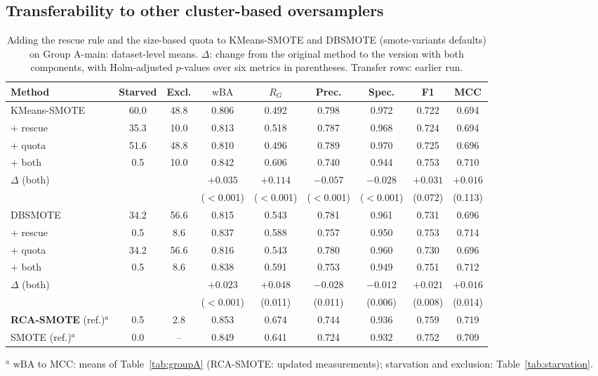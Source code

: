\documentclass[preprint,nopreprintline]{elsarticle}
\theoremstyle{plain}
\theoremstyle{definition}
\newcommand{\wba}{\mathrm{wBA}}
\newcommand{\rg}{R_{G}}
\newcommand{\tabfont}{\fontsize{8}{9.4}\selectfont}
\providecommand{\botrule}{\bottomrule}
\begin{document}
\subsection{Transferability to other cluster-based oversamplers}\label{sec:transfer}

\begin{table}[!htb]
\caption{Adding the rescue rule and the size-based quota to KMeans-SMOTE and DBSMOTE (smote-variants defaults) on Group A-main: dataset-level means. $\Delta$: change from the original method to the version with both components, with Holm-adjusted $p$-values over six metrics in parentheses. Transfer rows: earlier run.}\label{tab:transfer}
\centering\tabfont
\setlength{\tabcolsep}{2.4pt}
\begin{adjustbox}{max width=\textwidth}
\begin{tabular}{@{}lcccccccc@{}}
\toprule
Method & Starved & Excl. & $\wba$ & $\rg$ & Prec. & Spec. & F1 & MCC \\
\midrule
KMeans-SMOTE & 60.0 & 48.8 & 0.806 & 0.492 & 0.798 & 0.972 & 0.722 & 0.694 \\
\quad + rescue & 35.3 & 10.0 & 0.813 & 0.518 & 0.787 & 0.968 & 0.724 & 0.694 \\
\quad + quota & 51.6 & 48.8 & 0.810 & 0.496 & 0.789 & 0.970 & 0.725 & 0.696 \\
\quad + both & 0.5 & 10.0 & 0.842 & 0.606 & 0.740 & 0.944 & 0.753 & 0.710 \\
\quad $\Delta$ (both) & & & $+0.035$ & $+0.114$ & $-0.057$ & $-0.028$ & $+0.031$ & $+0.016$ \\
 & & & \scriptsize($<$0.001) & \scriptsize($<$0.001) & \scriptsize($<$0.001) & \scriptsize($<$0.001) & \scriptsize(0.072) & \scriptsize(0.113) \\
\midrule
DBSMOTE & 34.2 & 56.6 & 0.815 & 0.543 & 0.781 & 0.961 & 0.731 & 0.696 \\
\quad + rescue & 0.5 & 8.6 & 0.837 & 0.588 & 0.757 & 0.950 & 0.753 & 0.714 \\
\quad + quota & 34.2 & 56.6 & 0.816 & 0.543 & 0.780 & 0.960 & 0.730 & 0.696 \\
\quad + both & 0.5 & 8.6 & 0.838 & 0.591 & 0.753 & 0.949 & 0.751 & 0.712 \\
\quad $\Delta$ (both) & & & $+0.023$ & $+0.048$ & $-0.028$ & $-0.012$ & $+0.021$ & $+0.016$ \\
 & & & \scriptsize($<$0.001) & \scriptsize(0.011) & \scriptsize(0.011) & \scriptsize(0.006) & \scriptsize(0.008) & \scriptsize(0.014) \\
\midrule
\textbf{RCA-SMOTE} (ref.)$^{a}$ & 0.5 & 2.8 & 0.853 & 0.674 & 0.744 & 0.936 & 0.759 & 0.719 \\
SMOTE (ref.)$^{a}$ & 0.0 & -- & 0.849 & 0.641 & 0.724 & 0.932 & 0.752 & 0.709 \\
\botrule
\end{tabular}
\end{adjustbox}
\par\smallskip\raggedright\footnotesize $^{a}$ $\wba$ to MCC: means of Table~\ref{tab:groupA} (RCA-SMOTE: updated measurements); starvation and exclusion: Table~\ref{tab:starvation}.
\end{table}
\end{document}
